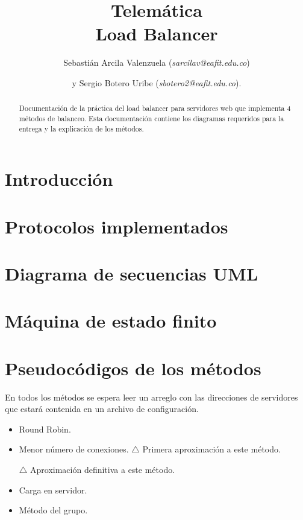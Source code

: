 \documentclass[
	final,
	notitlepage,
	narroweqnarray,
	inline,
	twoside,
	]{ieee}
\begin{document}
\title[Load Balancer]{
       Telemática\\ Load Balancer}


\author[]{Sebastián Arcila Valenzuela (\textit{sarcilav@eafit.edu.co})
\and{}y Sergio Botero Uribe (\textit{sbotero2@eafit.edu.co}).
}

\titletext{, \today}
\maketitle               

\begin{abstract} 
Documentación de la práctica del load balancer para servidores web que implementa 4 métodos de balanceo. Esta documentación
contiene los diagramas requeridos para la entrega y la explicación de los métodos.
\end{abstract}

\section{Introducción}
	

\section{Protocolos implementados}
	

\section{Diagrama de secuencias UML}
%	

\section{Máquina de estado finito}
	
	
\section{Pseudocódigos de los métodos}

	En todos los métodos se espera leer un arreglo con las direcciones de servidores que estará contenida en un archivo de configuración.
	\begin{itemize}
	\item Round Robin.
		
	\item Menor número de conexiones.
		$\triangle$ Primera aproximación a este método.
		
		$\triangle$ Aproximación definitiva a este método.
		
	\item Carga en servidor.
		
	\item Método del grupo.
		
	\end{itemize}
	
\end{document}
